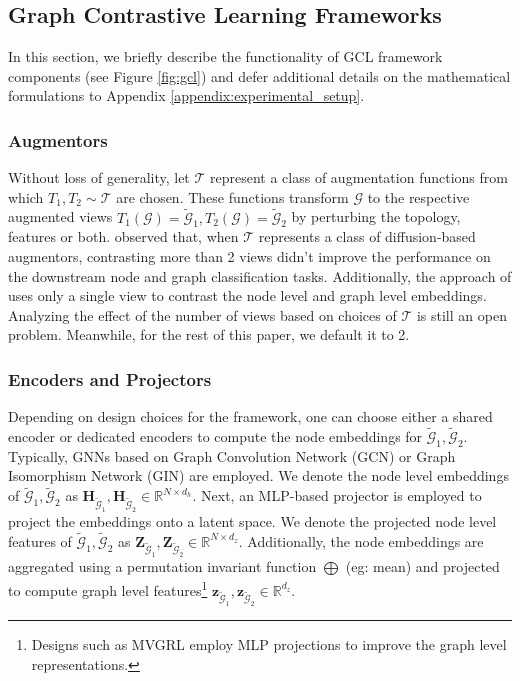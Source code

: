 \documentclass{article}
\def\mH{{\mathbf{H}}}
\def\mZ{{\mathbf{Z}}}
\def\vz{{\mathbf{z}}}
\def\gG{{\mathcal{G}}}
\def\gT{{\mathcal{T}}}
\def\sR{{\mathbb{R}}}
\theoremstyle{plain}
\theoremstyle{definition}
\theoremstyle{remark}
\begin{document}
\subsection{Graph Contrastive Learning Frameworks}

In this section, we briefly describe the functionality of GCL framework components (see Figure \ref{fig:gcl}) and defer additional details on the mathematical formulations to Appendix \ref{appendix:experimental_setup}.

\subsubsection{Augmentors}

Without loss of generality, let $\gT$ represent a class of augmentation functions from which $T_1, T_2 \sim \mathcal{T}$ are chosen. These functions transform $\gG$ to the respective augmented views $T_1(\gG) = \widetilde{\gG}_1, T_2(\gG) = \widetilde{\gG}_2$ by perturbing the topology, features or both. \citet{hassani2020contrastive} observed that, when $\gT$ represents a class of diffusion-based augmentors, contrasting more than 2 views didn't improve the performance on the downstream node and graph classification tasks. Additionally, the approach of \citet{velickovic2019deep} uses only a single view to contrast the node level and graph level embeddings. Analyzing the effect of the number of views based on choices of $\mathcal{T}$ is still an open problem. Meanwhile, for the rest of this paper, we default it to 2.

\subsubsection{Encoders and Projectors}

Depending on design choices for the framework, one can choose either a shared encoder \citep{you2020graph} or dedicated encoders \citep{hassani2020contrastive} to compute the node embeddings for $\widetilde{\gG}_1, \widetilde{\gG}_2$. Typically, GNNs based on Graph Convolution Network (GCN) \citep{kipf2016semi} or Graph Isomorphism Network (GIN) \citep{xu2018powerful} are employed. We denote the node level embeddings of $\widetilde{\gG}_1, \widetilde{\gG}_2$ as $\mH_{\widetilde{\gG}_1}, \mH_{\widetilde{\gG}_2} \in \sR^{N \times d_h}$. Next, an MLP-based projector is employed to project the embeddings onto a latent space. We denote the projected node level features of $\widetilde{\gG}_1, \widetilde{\gG}_2$ as $\mZ_{\widetilde{\gG}_1}, \mZ_{\widetilde{\gG}_2} \in \sR^{N \times d_z}$. Additionally, the node embeddings are aggregated using a permutation invariant function $\bigoplus$ (eg: mean) and projected to compute graph level features\footnote{Designs such as MVGRL \cite{hassani2020contrastive} employ MLP projections to improve the graph level representations.} $\vz_{\widetilde{\gG}_1}, \vz_{\widetilde{\gG}_2} \in \sR^{d_z}$. 
\end{document}
